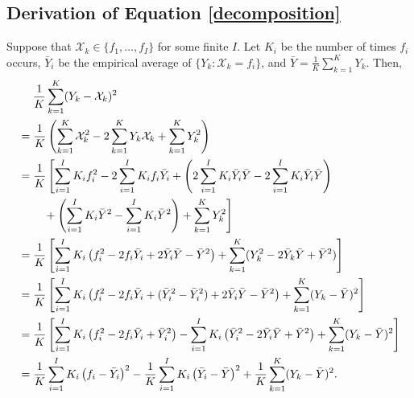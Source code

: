 \documentclass[12pt]{article}
\theoremstyle{definition}
\theoremstyle{definition}
\begin{document}
\subsection{Derivation of Equation \ref{decomposition}}
Suppose that $\mathcal{X}_k \in \{f_1, \dots, f_I\}$ for some finite $I$. Let $K_i$ be the number of times $f_i$ occurs, $\bar{Y}_i$ be the empirical average of $\{Y_k : \mathcal{X}_k = f_i\}$, and $\bar{Y} = \frac{1}{K} \sum_{k=1}^K Y_k$. Then,
\begin{align*}
&\hspace{1.3em}  \frac{1}{K} \sum_{k=1}^K (Y_k - \mathcal{X}_k)^2\\
 &= \frac{1}{K} \left( \sum_{k=1}^K \mathcal{X}_k^2 - 2\sum_{k=1}^KY_k\mathcal{X}_k + \sum_{k=1}^KY_k^2 \right)\\
 &= \frac{1}{K} \left[ \sum_{i=1}^I K_i f_i^2 - 2\sum_{i=1}^I K_i f_i \bar{Y}_i + \left( 2 \sum_{i=1}^IK_i\bar{Y}_i\bar{Y}- 2 \sum_{i=1}^IK_i\bar{Y}_i\bar{Y} \right) \right. \\
 &\qquad \left. {} +  \left( \sum_{i=1}^IK_i\bar{Y}^2- \sum_{i=1}^IK_i\bar{Y}^2 \right) + \sum_{k=1}^KY_k^2 \right]\\
 &= \frac{1}{K} \left[ \sum_{i=1}^I K_i \left( f_i^2 - 2 f_i \bar{Y}_i + 2 \bar{Y}_i\bar{Y}-  \bar{Y}^2 \right) + \sum_{k=1}^K(Y_k^2 -2\bar{Y}_k\bar{Y}+ \bar{Y}^2) \right]\\
 &= \frac{1}{K} \left[ \sum_{i=1}^I K_i \left( f_i^2 - 2 f_i \bar{Y}_i + (\bar{Y}_i^2 - \bar{Y}_i^2) + 2 \bar{Y}_i\bar{Y}-  \bar{Y}^2 \right) + \sum_{k=1}^K(Y_k -\bar{Y})^2 \right]\\
 &= \frac{1}{K} \left[ \sum_{i=1}^I K_i \left( f_i^2 - 2 f_i \bar{Y}_i + \bar{Y}_i^2 \right)  - \sum_{i=1}^I K_i  \left(\bar{Y}_i^2 - 2 \bar{Y}_i\bar{Y} + \bar{Y}^2 \right) + \sum_{k=1}^K(Y_k -\bar{Y})^2 \right]\\
 &=  \frac{1}{K} \sum_{i=1}^I K_i \left( f_i - \bar{Y}_i \right)^2  - \frac{1}{K} \sum_{i=1}^I K_i  \left(\bar{Y}_i - \bar{Y} \right)^2 + \frac{1}{K} \sum_{k=1}^K(Y_k -\bar{Y})^2.
\end{align*}




%

\end{document}
